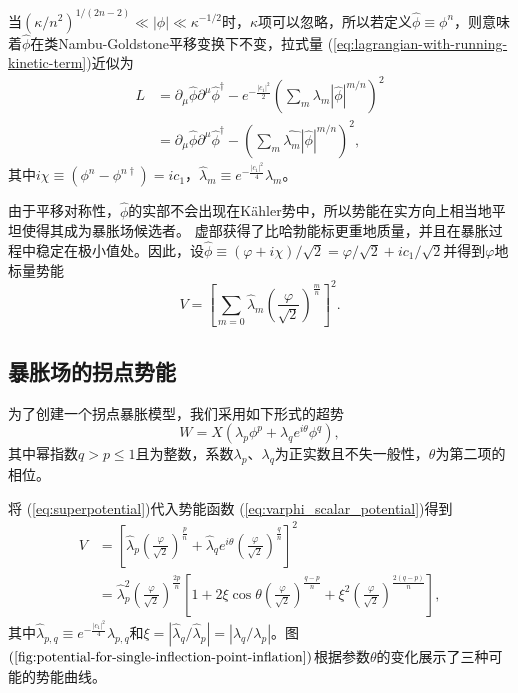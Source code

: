 当${(\kappa/n^2)}^{1/(2n-2)}\ll |\phi| \ll
\kappa^{-1/2}$时，$\kappa$项可以忽略，所以若定义$\hat{\phi} \equiv
\phi^n$，则意味着$\hat{\phi}$在类Nambu-Goldstone平移变换下不变，拉式量
(\ref{eq:lagrangian-with-running-kinetic-term})近似为
\begin{equation}
\begin{split}
    L &= \partial_\mu \hat{\phi}\partial^\mu \hat{\phi}^\dagger -
    e^{-\frac{|c_1|^2}{2}}{(\sum_m \lambda_m|\hat{\phi}|^{m/n})}^2 \\
    &= \partial_\mu \hat{\phi} \partial^\mu \hat{\phi}^\dagger - 
    {(\sum_m \hat{\lambda_m}|\hat{\phi}|^{m/n})}^2,
\end{split}
\end{equation}
其中$i\chi \equiv (\phi^n - \phi^{n\dagger})=i c_1$，$\hat{\lambda}_m\equiv
e^{-\frac{|c_1|^2}{4}}\lambda_m$。

由于平移对称性，$\hat{\phi}$的实部不会出现在K\"ahler势中，所以势能在实方向上相当地平坦使得其成为暴胀场候选者。
虚部获得了比哈勃能标更重地质量，并且在暴胀过程中稳定在极小值处。因此，设$\hat{\phi}\equiv
(\varphi+i \chi)/\sqrt{2}=\varphi/\sqrt{2}+i
c_1/ \sqrt{2}$并得到$\varphi$地标量势能
\begin{equation}\label{eq:varphi_scalar_potential}
    V = {\left[\sum_{m=0}\hat{\lambda}_m
    {\left(\frac{\varphi}{\sqrt{2}}\right)}^{\frac{m}{n}}\right]}^2.
\end{equation}

\subsection{暴胀场的拐点势能}
为了创建一个拐点暴胀模型，我们采用如下形式的超势
\begin{equation}\label{eq:superpotential}
    W = X(\lambda_p\phi^p + \lambda_q e^{i\theta}\phi^q),
\end{equation}
其中幂指数$q > p \le
1$且为整数，系数$\lambda_p$、$\lambda_q$为正实数且不失一般性，$\theta$为第二项的相位。

将 (\ref{eq:superpotential})代入势能函数
(\ref{eq:varphi_scalar_potential})得到
\begin{equation}
  \label{eq:scalar_potential}
\begin{split}
    V &= {\left[ \hat{\lambda}_p {\left(\frac{\varphi}{\sqrt{2}}\right)}^{\frac{p}{n}}
    + \hat{\lambda}_q e^{i\theta}{\left(\frac{\varphi}{\sqrt{2}}\right)}^{\frac{q}{n}}\right]}^2 \\
    &= \hat{\lambda}_p^2 {\left(\frac{\varphi}{\sqrt{2}}\right)}^{\frac{2p}{n}}
    \left[1 + 2\xi\cos\theta {\left(\frac{\varphi}{\sqrt{2}}\right)}^{\frac{q-p}{n}}
    + \xi^2 {\left(\frac{\varphi}{\sqrt{2}}\right)}^{\frac{2(q-p)}{n}}\right],
\end{split}
\end{equation}
其中$\hat{\lambda}_{p,q}\equiv
e^{-\frac{|c_1|^2}{4}}\lambda_{p,q}$和$\xi=|\hat{\lambda}_q/\hat{\lambda}_p|=|\lambda_q/\lambda_p|$。图$(\ref{fig:potential-for-single-inflection-point-inflation})$根据参数$\theta$的变化展示了三种可能的势能曲线。

